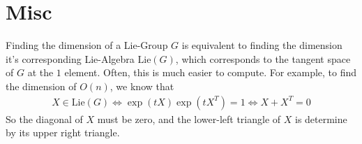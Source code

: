 
\section{Misc}

Finding the dimension of a Lie-Group $G$ is equivalent to finding the dimension it's corresponding Lie-Algebra $\text{Lie}(G)$, which corresponds to the tangent space of $G$ at the $1$ element.
Often, this is much easier to compute.
For example, to find the dimension of $O(n)$, we know that
\begin{align*}
  X \in \text{Lie}(G) \iff \exp(tX) \exp(tX^{T}) = 1 \iff X + X^{T} = 0
\end{align*}
So the diagonal of $X$ must be zero, and the lower-left triangle of $X$ is determine by its upper right triangle.


